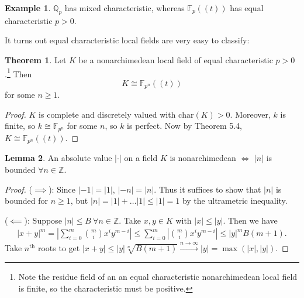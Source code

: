 \documentclass{article}
\theoremstyle{definition}
\newtheorem{theorem}{Theorem}[section]
\newtheorem{lemma}[theorem]{Lemma}
\newtheorem{example}{Example}[section]
\begin{document}
\begin{example}
    $\mathbb{Q}_p$ has mixed characteristic, whereas $\mathbb{F}_p((t))$ has equal characteristic $p>0$.
\end{example}
It turns out equal characteristic local fields are very easy to classify:
\begin{theorem}
    Let $K$ be a nonarchimedean local field of equal characteristic $p>0$.\footnote{Note the residue field of an an equal characteristic nonarchimedean local field is finite, so the characteristic must be positive.} Then \[
    K \cong \mathbb{F}_{p^n}((t))
    \]
    for some $n\ge 1$.
\end{theorem}
\begin{proof}
    $K$ is complete and discretely valued with $\text{char}(K)>0$. Moreover, $k$ is finite, so $k \cong \mathbb{F}_{p^n}$ for some $n$, so $k$ is perfect. Now by Theorem 5.4, $K \cong \mathbb{F}_{p^n}((t))$.
\end{proof}
\begin{lemma}
    An absolute value $|\cdot|$ on a field $K$ is nonarchimedean $\iff$ $|n|$ is bounded $\forall n \in \mathbb{Z}$.
\end{lemma}
\begin{proof}
    ($\implies $): Since $|-1|=|1|$, $|-n|=|n|$. Thus it suffices to show that $|n|$ is bounded for $n\ge 1$, but $|n| = |1| + \ldots |1| \le |1| = 1$ by the ultrametric inequality.
    \vspace{1mm}
     
    ($\impliedby$): Suppose $|n|\le B~\forall n \in \mathbb{Z}$. Take $x,y \in K$ with $|x|\le |y|$. Then we have 
    \begin{align*}
        |x+y|^m = \left|\sum_{i=0}^{m} {m\choose i}x^i y^{m-i}\right| \le \sum_{i=0}^{m} \left|{m\choose i}x^i y^{m-i}\right| \le |y|^m B (m+1).
    \end{align*}
    Take $n^{\text{th}}$ roots to get $|x+y|\le |y|\sqrt[n]{B(m+1)} \stackrel{n \to \infty}{\to} |y| = \max(|x|,|y|)$.
\end{proof}

\end{document}
